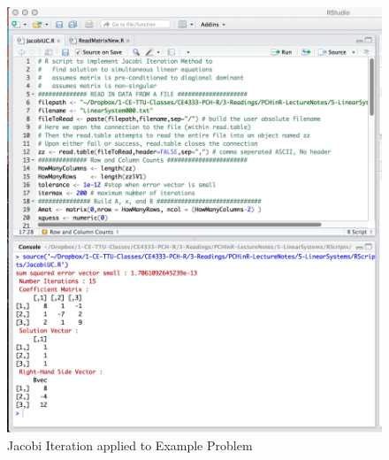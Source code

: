 \begin{figure}[h!] %
   \centering
   \includegraphics[width=6in]{./5-LinearSystems/JacobiUC-Works.jpg} 
   \caption{Jacobi Iteration applied to Example Problem}
   \label{fig:JacobiUC-Works}
\end{figure}
\clearpage
